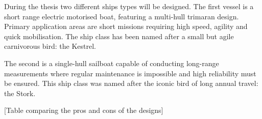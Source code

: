 During the thesis two different ships types will be designed. The first vessel is a short range electric motorised boat, featuring a multi-hull trimaran design. Primary application areas are short missions requiring high speed, agility and quick mobilisation. The ship class has been named after a small but agile carnivorous bird: the Kestrel.

The second is a single-hull sailboat capable of conducting long-range measurements where regular maintenance is impossible and high reliability must be ensured. This ship class was named after the iconic bird of long annual travel: the Stork.

[Table comparing the pros and cons of the designs]